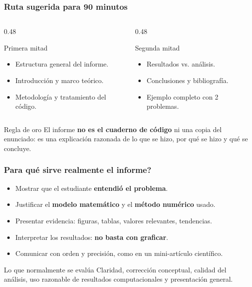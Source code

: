 \begin{frame}
\frametitle{Ruta sugerida para 90 minutos}
\begin{columns}[T]
\begin{column}{0.48\textwidth}
\begin{block}{Primera mitad}
\begin{itemize}
    \item Estructura general del informe.
    \item Introducci\'on y marco te\'orico.
    \item Metodolog\'ia y tratamiento del c\'odigo.
\end{itemize}
\end{block}
\end{column}
\begin{column}{0.48\textwidth}
\begin{block}{Segunda mitad}
\begin{itemize}
    \item Resultados vs. an\'alisis.
    \item Conclusiones y bibliograf\'ia.
    \item Ejemplo completo con 2 problemas.
\end{itemize}
\end{block}
\end{column}
\end{columns}

\vspace{0.25cm}
\begin{alertblock}{Regla de oro}
El informe \textbf{no es el cuaderno de c\'odigo} ni una copia del enunciado: es una explicaci\'on razonada de lo que se hizo, por qu\'e se hizo y qu\'e se concluye.
\end{alertblock}
\end{frame}

\begin{frame}
\frametitle{\textquestiondown{}Para qu\'e sirve realmente el informe?}
\begin{itemize}
    \item Mostrar que el estudiante \textbf{entendi\'o el problema}.
    \item Justificar el \textbf{modelo matem\'atico} y el \textbf{m\'etodo num\'erico} usado.
    \item Presentar evidencia: figuras, tablas, valores relevantes, tendencias.
    \item Interpretar los resultados: \textbf{no basta con graficar}.
    \item Comunicar con orden y precisi\'on, como en un mini-art\'iculo cient\'ifico.
\end{itemize}

\vspace{0.2cm}
\begin{block}{Lo que normalmente se eval\'ua}
Claridad, correcci\'on conceptual, calidad del an\'alisis, uso razonable de resultados computacionales y presentaci\'on general.
\end{block}
\end{frame}

